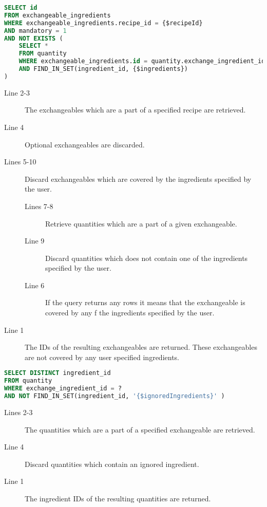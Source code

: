 \begin{lstlisting}[language=SQL, morekeywords={FIND_IN_SET}, float=h, label={}, caption={Query to find the exchangeables that are not covered.}]
SELECT id
FROM exchangeable_ingredients
WHERE exchangeable_ingredients.recipe_id = {$recipeId}
AND mandatory = 1
AND NOT EXISTS (
    SELECT * 
    FROM quantity
    WHERE exchangeable_ingredients.id = quantity.exchange_ingredient_id
    AND FIND_IN_SET(ingredient_id, {$ingredients})
)
\end{lstlisting}

\begin{description}
\item[Line 2-3] The exchangeables which are a part of a specified recipe are retrieved.
\item[Line 4] Optional exchangeables are discarded.
\item[Lines 5-10] Discard exchangeables which are covered by the ingredients specified by the user.
	\begin{description}
	\item[Lines 7-8] Retrieve quantities which are a part of a given exchangeable.
	\item[Line 9] Discard quantities which does not contain one of the ingredients specified by the user.
	\item[Line 6] If the query returns any rows it means that the exchangeable is covered by any f the ingredients specified by the user.
	\end{description}
\item[Line 1] The IDs of the resulting exchangeables are returned. These exchangeables are not covered by any user specified ingredients.
\end{description}


\begin{lstlisting}[language=SQL, morekeywords={FIND_IN_SET}, float=h, label={}, caption={Query to get the ingredient of an exchangeable, excluding ignored ingredients.}]
SELECT DISTINCT ingredient_id
FROM quantity
WHERE exchange_ingredient_id = ?
AND NOT FIND_IN_SET(ingredient_id, '{$ignoredIngredients}' )
\end{lstlisting}

\begin{description}
\item[Lines 2-3] The quantities which are a part of a specified exchangeable are retrieved.
\item[Line 4] Discard quantities which contain an ignored ingredient.
\item[Line 1] The ingredient IDs of the resulting quantities are returned.
\end{description}








